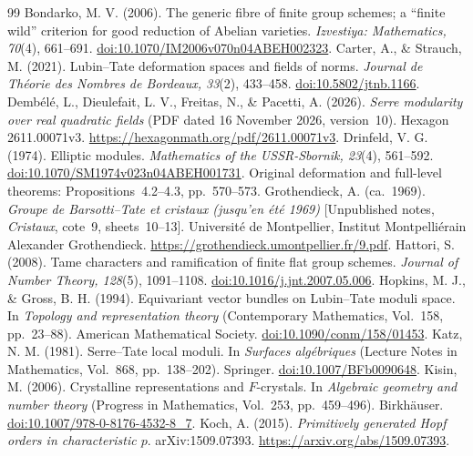 \begin{thebibliography}{99}
Bondarko, M. V. (2006). The generic fibre of finite group schemes; a ``finite wild'' criterion for good reduction of Abelian varieties. \emph{Izvestiya: Mathematics, 70}(4), 661--691. \href{https://doi.org/10.1070/IM2006v070n04ABEH002323}{doi:10.1070/IM2006v070n04ABEH002323}.
Carter, A., \& Strauch, M. (2021). Lubin--Tate deformation spaces and fields of norms. \emph{Journal de Th\'eorie des Nombres de Bordeaux, 33}(2), 433--458. \href{https://doi.org/10.5802/jtnb.1166}{doi:10.5802/jtnb.1166}.
Demb\'el\'e, L., Dieulefait, L. V., Freitas, N., \& Pacetti, A. (2026). \emph{Serre modularity over real quadratic fields} (PDF dated 16 November 2026, version~10). Hexagon 2611.00071v3. \url{https://hexagonmath.org/pdf/2611.00071v3}.
Drinfeld, V. G. (1974). Elliptic modules. \emph{Mathematics of the USSR-Sbornik, 23}(4), 561--592. \href{https://doi.org/10.1070/SM1974v023n04ABEH001731}{doi:10.1070/SM1974v023n04ABEH001731}. Original deformation and full-level theorems: Propositions~4.2--4.3, pp.~570--573.
Grothendieck, A. (ca.~1969). \emph{Groupe de Barsotti--Tate et cristaux (jusqu'en \'et\'e 1969)} [Unpublished notes, \emph{Cristaux}, cote~9, sheets~10--13]. Universit\'e de Montpellier, Institut Montpelli\'erain Alexander Grothendieck. \url{https://grothendieck.umontpellier.fr/9.pdf}.
Hattori, S. (2008). Tame characters and ramification of finite flat group schemes. \emph{Journal of Number Theory, 128}(5), 1091--1108. \href{https://doi.org/10.1016/j.jnt.2007.05.006}{doi:10.1016/j.jnt.2007.05.006}.
Hopkins, M. J., \& Gross, B. H. (1994). Equivariant vector bundles on Lubin--Tate moduli space. In \emph{Topology and representation theory} (Contemporary Mathematics, Vol.~158, pp.~23--88). American Mathematical Society. \href{https://doi.org/10.1090/conm/158/01453}{doi:10.1090/conm/158/01453}.
Katz, N. M. (1981). Serre--Tate local moduli. In \emph{Surfaces alg\'ebriques} (Lecture Notes in Mathematics, Vol.~868, pp.~138--202). Springer. \href{https://doi.org/10.1007/BFb0090648}{doi:10.1007/BFb0090648}.
Kisin, M. (2006). Crystalline representations and $F$-crystals. In \emph{Algebraic geometry and number theory} (Progress in Mathematics, Vol.~253, pp.~459--496). Birkh\"auser. \href{https://doi.org/10.1007/978-0-8176-4532-8_7}{doi:10.1007/978-0-8176-4532-8\_7}.
Koch, A. (2015). \emph{Primitively generated Hopf orders in characteristic $p$}. arXiv:1509.07393. \url{https://arxiv.org/abs/1509.07393}.


\end{thebibliography}

